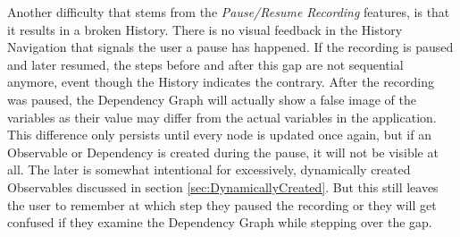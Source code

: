 Another difficulty that stems from the \emph{Pause/Resume Recording} features, is that it results in a broken History. There is no visual feedback in the History Navigation that signals the user a pause has happened. If the recording is paused and later resumed, the steps before and after this gap are not sequential anymore, event though the History indicates the contrary. After the recording was paused, the Dependency Graph will actually show a false image of the variables as their value may differ from the actual variables in the application. This difference only persists until every node is updated once again, but if an Observable or Dependency is created during the pause, it will not be visible at all. The later is somewhat intentional for excessively, dynamically created Observables discussed in section \ref{sec:DynamicallyCreated}. But this still leaves the user to remember at which step they paused the recording or they will get confused if they examine the Dependency Graph while stepping over the gap.
	
